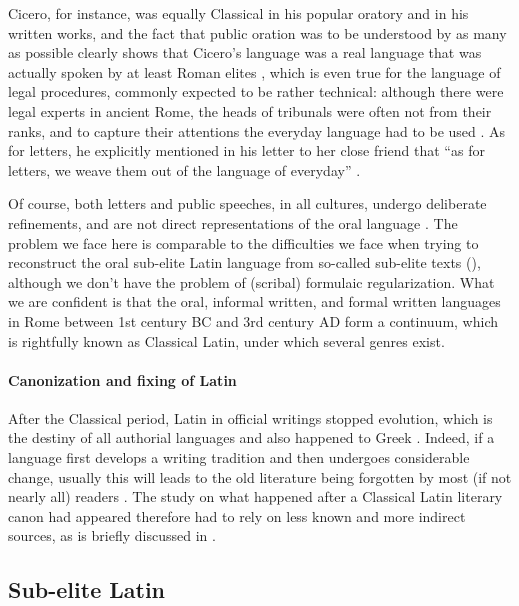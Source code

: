 \documentclass[a4paper, oneside, 12pt]{report}
\newcommand*{\citepage}[1]{p.~{#1}}
\newcommand*{\citepages}[1]{pp.~{#1}}
\begin{document}
Cicero, for instance, was equally Classical in his popular oratory and in his written works,
and the fact that public oration was to be understood by as many as possible
clearly shows that Cicero's language was a real language that was actually spoken 
by at least Roman elites
\citep[\citepage{71}]{leonhardt2013latin},
which is even true for the language of legal procedures,
commonly expected to be rather technical:
although there were legal experts in ancient Rome,
the heads of tribunals were often not from their ranks,
and to capture their attentions the everyday language had to be used
\citep[\citepages{385-386,464-465}]{clackson2011companion}.
As for letters, he explicitly mentioned in his letter to her close friend that 
``as for letters, we weave them out of the language of everyday''
\citep[\citepage{428}]{clackson2011companion}.

Of course, both letters and public speeches, in all cultures, undergo deliberate refinements,
and are not direct representations of the oral language
\citep[\citepages{397-399,434-438}]{clackson2011companion}.
The problem we face here is comparable to the difficulties we face
when trying to reconstruct the oral sub-elite Latin language
from so-called sub-elite texts (),
although we don't have the problem of (scribal) formulaic regularization.
What we are confident is that the oral, informal written, and formal written languages in Rome
between 1st century BC and 3rd century AD form a continuum,
which is rightfully known as Classical Latin,
under which several genres exist.

\paragraph*{Canonization and fixing of Latin}
After the Classical period,
Latin in official writings stopped evolution,
which is the destiny of all authorial languages
and also happened to Greek \citep[\citepages{71-72}]{leonhardt2013latin}.
Indeed, if a language first develops a writing tradition
and then undergoes considerable change,
usually this will leads to the old literature being forgotten by most (if not nearly all) readers
\citep[\citepage{144}]{leonhardt2013latin}. 
The study on what happened after a Classical Latin literary canon had appeared
therefore had to rely on less known and more indirect sources,
as is briefly discussed in .

\subsection{Sub-elite Latin}\label{sec:introduction.history.sub-elite}
\end{document}
